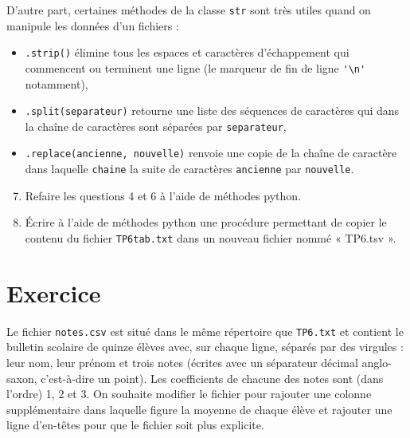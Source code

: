 D'autre part, certaines méthodes de la classe \verb|str| sont très utiles quand on manipule les données d'un fichiers :
\begin{itemize}
\item \verb|.strip()| élimine tous les espaces et caractères d'échappement qui commencent ou terminent une ligne (le marqueur de fin de ligne \verb|'\n'| notamment),
\item \verb|.split(separateur)| retourne une liste des séquences de caractères qui dans la chaîne de caractères sont séparées par \verb|separateur|,
\item \verb|.replace(ancienne, nouvelle)| renvoie une copie de la chaîne de caractère dans laquelle \verb|chaine| la suite de caractères \verb|ancienne| par \verb|nouvelle|.
\end{itemize}

\begin{enumerate}
\setcounter{enumi}{6}
 \item Refaire les questions 4 et 6 à l'aide de méthodes python.
 \item Écrire à l'aide de méthodes python une procédure permettant de copier le contenu du fichier \verb|TP6tab.txt| dans un nouveau fichier nommé « TP6.tsv ».
\end{enumerate}

\section*{Exercice}

Le fichier \verb|notes.csv| est situé dans le même répertoire que \verb|TP6.txt| et contient le bulletin scolaire de quinze élèves avec, sur chaque ligne, séparés par des virgules : leur nom, leur prénom et trois notes (écrites avec un séparateur décimal anglo-saxon, c'est-à-dire un point). Les coefficients de chacune des notes sont (dans l'ordre) 1, 2 et 3. On souhaite modifier le fichier pour rajouter une colonne supplémentaire dans laquelle figure la moyenne de chaque élève et rajouter une ligne d'en-têtes pour que le fichier soit plus explicite.

